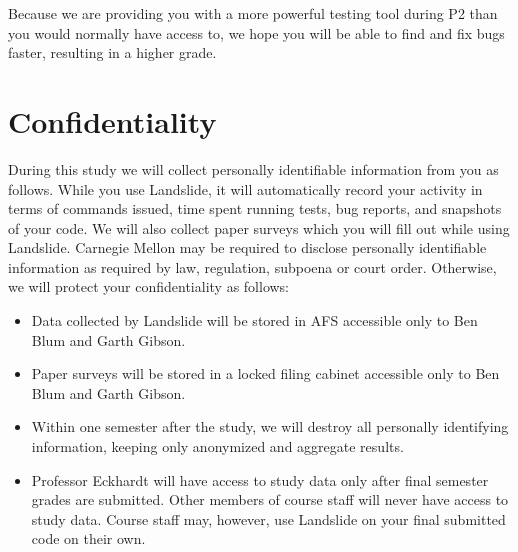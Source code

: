 \documentclass{article}
\begin{document}
Because we are providing you with a more powerful testing tool during P2 than you would normally have access to, we hope you will be able to find and fix bugs faster, resulting in a higher grade.
%

\section{Confidentiality}

During this study we will collect personally identifiable information from you as follows. While you use Landslide, it will automatically record your activity in terms of commands issued, time spent running tests, bug reports, and snapshots of your code. We will also collect paper surveys which you will fill out while using Landslide.
Carnegie Mellon may be required to disclose personally identifiable information as required by law, regulation, subpoena or court order.
Otherwise, we will protect your confidentiality as follows:

\begin{itemize}
	\item Data collected by Landslide will be stored in AFS accessible only to Ben Blum and Garth Gibson.
	\item Paper surveys will be stored in a locked filing cabinet accessible only to Ben Blum and Garth Gibson.
	\item Within one semester after the study, we will destroy all personally identifying information, keeping only anonymized and aggregate results.
	\item Professor Eckhardt will have access to study data only after final semester grades are submitted. Other members of course staff will never have access to study data. Course staff may, however, use Landslide on your final submitted code on their own.
\end{itemize}
%
\end{document}
